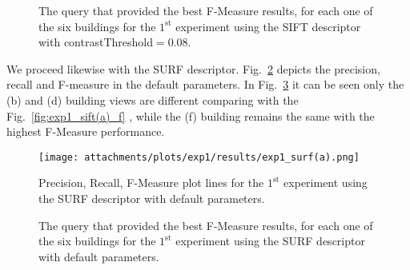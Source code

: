     	    \begin{figure}[H] %
        		\centering
        		
        		\caption{The query that provided the best F-Measure results, for each one of the six buildings for the $1^\text{st}$  experiment using the SIFT descriptor with contrastThreshold$=$0.08.}
        		\label{fig:exp1_sift(b)_f}
    	    \end{figure}
	  \newpage
	  
	  We proceed likewise with the SURF descriptor. Fig.~\ref{fig:exp1_surf_a} depicts the precision, recall and F-measure in the default parameters. In Fig.~\ref{fig:exp1_surf(a)_f} it can be seen only the (b) and (d) building views are different comparing with the Fig.~\ref{fig:exp1_sift(a)_f} , while the (f) building remains the same with the highest F-Measure performance.
	  \begin{figure}[ht!] %
	    \centering
	    \texttt{[image: attachments/plots/exp1/results/exp1\_surf(a).png]}
	    \caption{Precision, Recall, F-Measure plot lines for the $1^\text{st}$  experiment using the SURF descriptor with default parameters.}
	    \label{fig:exp1_surf_a}
	  \end{figure}       
	  \newpage
	  \begin{figure}[ht!] %
		  \centering
		  
		  \caption{The query that provided the best F-Measure results, for each one of the six buildings for the $1^\text{st}$  experiment using the SURF descriptor with default parameters.}
		  \label{fig:exp1_surf(a)_f}
	  \end{figure}
	  
